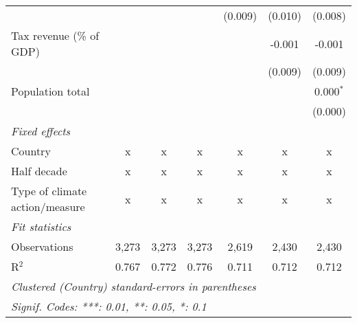 \begin{tabular}{lcccccc}
                                                             &         &               &               & (0.009)        & (0.010)        & (0.008)\\   
   Tax revenue (\% of GDP)                                   &         &               &               &                & -0.001         & -0.001\\   
                                                             &         &               &               &                & (0.009)        & (0.009)\\   
   Population total                                          &         &               &               &                &                & 0.000$^{*}$\\   
                                                             &         &               &               &                &                & (0.000)\\   
   \emph{Fixed effects}\\
   Country                                                   & x       & x             & x             & x              & x              & x\\  
   Half decade                                               & x       & x             & x             & x              & x              & x\\  
   Type of climate action/measure                            & x       & x             & x             & x              & x              & x\\  
   \midrule \emph{Fit statistics}\\
   Observations                                              & 3,273   & 3,273         & 3,273         & 2,619          & 2,430          & 2,430\\  
   R$^2$                                                     & 0.767   & 0.772         & 0.776         & 0.711          & 0.712          & 0.712\\  
   \midrule
   \multicolumn{7}{l}{\emph{Clustered (Country) standard-errors in parentheses}}\\
   \multicolumn{7}{l}{\emph{Signif. Codes: ***: 0.01, **: 0.05, *: 0.1}}\\
\end{tabular}
\par\endgroup


